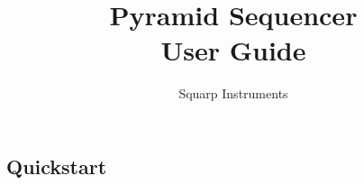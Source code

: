 



\title{Pyramid Sequencer\\User Guide}
\author{Squarp Instruments}
\date{}

\maketitle{}
\begin{multicols*}{2}
\raggedcolumns{}
\pagestyle{bodypagestyle}

\frontmatter
\tableofcontents{}

\mainmatter
\chapter{Quickstart}














\end{multicols*}


